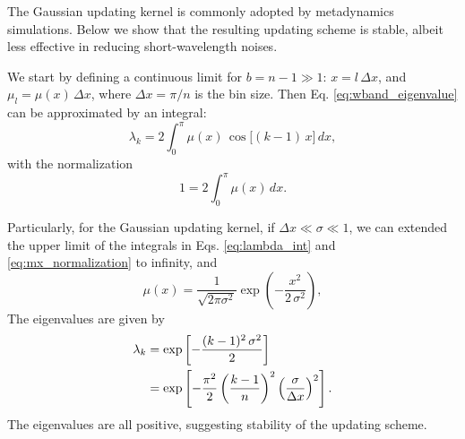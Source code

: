 \documentclass[reprint, floatfix]{revtex4-1}
\begin{document}
The Gaussian updating kernel is commonly
adopted by metadynamics simulations.
%
Below we show that the resulting updating scheme
is stable, albeit less effective
in reducing short-wavelength noises.



We start by defining
a continuous limit
for $b = n - 1 \gg 1$:
$x = l \, \Delta x$,
and
$\mu_l = \mu(x) \, \Delta x$,
where
$\Delta x = \pi/n$
is the bin size.
%
Then
Eq. \eqref{eq:wband_eigenvalue}
can be approximated by an integral:
%
\begin{equation}
\lambda_k
=
2 \int_0^\pi
  \mu(x) \, \cos \bigl[ (k-1) \, x \bigr] \, dx,
\label{eq:lambda_int}
\end{equation}
%
with the normalization
%
\begin{equation}
1 = 2 \int_0^\pi \mu(x) \, dx.
\label{eq:mx_normalization}
\end{equation}



Particularly,
for the Gaussian updating kernel,
if $\Delta x \ll \sigma \ll 1$,
we can extended
the upper limit of the integrals
in Eqs. \eqref{eq:lambda_int}
and \eqref{eq:mx_normalization}
to infinity, and
%
\begin{equation}
\mu(x)
=
\frac{            1            }
     { \sqrt{ 2 \pi \sigma^2 } }
%
\exp\left(
      -\frac{       x^2     }
            { 2 \, \sigma^2 }
    \right),
\end{equation}
%
%
The eigenvalues are given by
%
\begin{align}
\lambda_k
&=
\exp\left[
      -\frac{ (k - 1)^2 \, \sigma^2 }
            {           2           }
    \right]
\notag
\\
&=
\exp\left[
      -\frac{ \pi^2 }{ 2 }
      \left(
        \frac{ k - 1 }
             {   n   }
      \right)^2
      \left(
        \frac{  \sigma }
             { \Delta x }
      \right)^2
    \right]
.
\label{eq:lambda_Gaussian}
\end{align}
%
The eigenvalues are all positive,
suggesting stability of the updating scheme.
\end{document}
